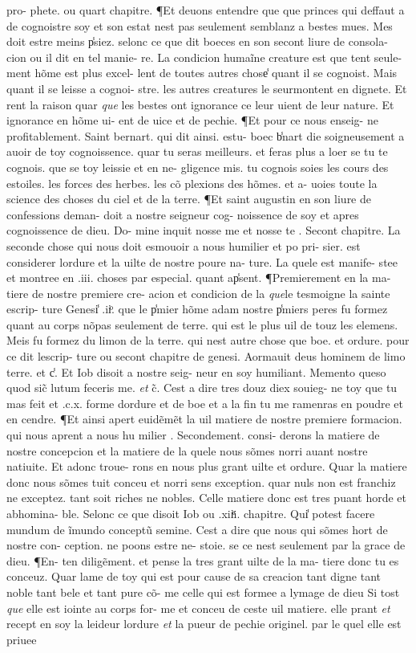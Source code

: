\documentclass{article}
\begin{document}
\begin{pages}
pro- phete. ou quart chapitre. ¶Et deuons entendre que que princes qui deffaut a de cognoistre soy et son estat nest pas seulement semblanz a bestes mues. Mes doit estre meins p̾siez. selonc ce que dit boeces en son secont liure de consola- cion ou il dit en tel manie- re. La condicion humaĩne creature est que tent seule- ment hõme est plus excel- lent de toutes autres chose̾ quant il se cognoist. Mais quant il se leisse a cognoi- stre. les autres creatures le seurmontent en dignete. Et rent la raison quar \textit{que} les bestes ont ignorance ce leur uient de leur nature. Et ignorance en hõme ui- ent de uice et de pechie. ¶Et pour ce nous enseig- ne profitablement. Saint bernart. qui dit ainsi. estu- boec b̾nart die soigneusement a auoir de toy cognoissence. quar tu seras meilleurs. et feras plus a loer se tu te cognois. que se toy leissie et en ne- gligence mis. tu cognois soies les cours des estoiles. les forces des herbes. les cõ plexions des hõmes. et a- uoies toute la science des choses du ciel et de la terre. ¶Et saint augustin en son liure de confessions deman- doit a nostre seigneur cog- noissence de soy et apres cognoissence de dieu. Do- mine inquit nosse me et nosse te . Secont chapitre. La seconde chose qui nous doit esmouoir a nous humilier et po pri- sier. est considerer lordure et la uilte de nostre poure na- ture. La quele est manife- stee et montree en .iii. choses par especial. quant ap̾sent. ¶Premierement en la ma- tiere de nostre premiere cre- acion et condicion de la \textit{que}le tesmoigne la sainte escrip- ture Genesi̾ .iiͦ. que le p̾mier hõme adam nostre p̾miers peres fu formez quant au corps nõpas seulement de terre. qui est le plus uil de touz les elemens. Meis fu formez du limon de la terre. qui nest autre chose que boe. et ordure. pour ce dit lescrip- ture ou secont chapitre de genesi. Aormauit deus hominem de limo terre. et c̾. Et Iob disoit a nostre seig- neur en soy humiliant. Memento queso quod sic̃ lutum feceris me. \textit{et} c̃. Cest a dire tres douz diex souieg- ne toy que tu mas feit et .c.x. forme dordure et de boe et a la fin tu me ramenras en poudre et en cendre. ¶Et ainsi apert euidẽmẽt la uil matiere de nostre premiere formacion. qui nous aprent a nous hu milier . Secondement. consi- derons la matiere de nostre concepcion et la matiere de la quele nous sõmes norri auant nostre natiuite. Et adonc troue- rons en nous plus grant uilte et ordure. Quar la matiere donc nous sõmes tuit conceu et norri sens exception. quar nuls non est franchiz ne exceptez. tant soit riches ne nobles. Celle matiere donc est tres puant horde et abhomina- ble. Selonc ce que disoit Iob ou .xiiͤi. chapitre. Qui̾ potest facere mundum de ĩmundo conceptũ semine. Cest a dire que nous qui sõmes hort de nostre con- ception. ne poons estre ne- stoie. se ce nest seulement par la grace de dieu. ¶En- ten diligẽment. et pense la tres grant uilte de la ma- tiere donc tu es conceuz. Quar lame de toy qui est pour cause de sa creacion tant digne tant noble tant bele et tant pure cõ- me celle qui est formee a lymage de dieu Si tost \textit{que} elle est iointe au corps for- me et conceu de ceste uil matiere. elle prant \textit{et} recept en soy la leideur lordure \textit{et} la pueur de pechie originel. par le quel elle est priuee 
\end{pages}
\end{document}
